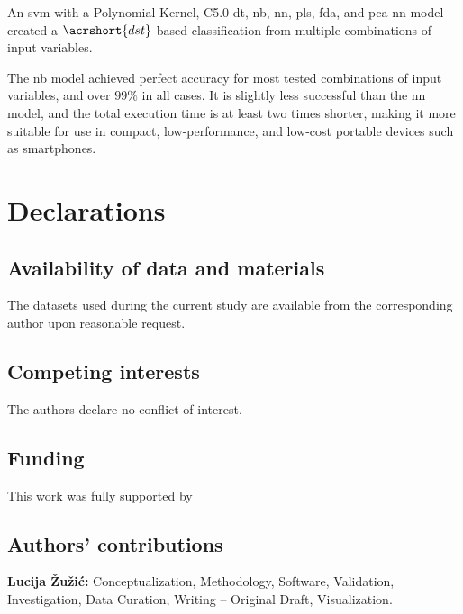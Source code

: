 \documentclass[sn-mathphys-num]{sn-jnl}%
\begin{document}
An \acrfull{svm} with a Polynomial Kernel, C5.0 \acrfull{dt}, \acrfull{nb}, \acrfull{nn}, \acrfull{pls}, \acrfull{fda}, and \acrfull{pca} \acrshort{nn} model created a $\acrshort{dst}$-based classification from multiple combinations of input variables.

The \acrshort{nb} model achieved perfect accuracy for most tested combinations of input variables, and over $99\%$ in all cases. It is slightly less successful than the \acrshort{nn} model, and the total execution time is at least two times shorter, making it more suitable for use in compact, low-performance, and low-cost portable devices such as smartphones.

\clearpage

\printglossary[type=\acronymtype]

\section{Declarations}

\subsection{Availability of data and materials}

The datasets used during the current study are available from the corresponding author upon reasonable request.

\subsection{Competing interests}

The authors declare no conflict of interest.

\subsection{Funding}

This work was fully supported by

\subsection{Authors' contributions}

\textbf{Lucija Žužić:} Conceptualization, Methodology, Software, Validation, Investigation, Data Curation, Writing -- Original Draft, Visualization.
\end{document}
